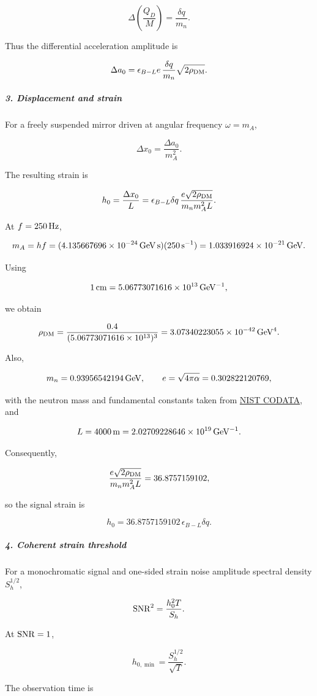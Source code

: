 \[
\Delta\!\left(\frac{Q_D}{M}\right)=\frac{\delta q}{m_n}.
\]

Thus the differential acceleration amplitude is

\[
\Delta a_0 =\epsilon_{B-L}e\,\frac{\delta q}{m_n} \sqrt{2\rho_{\rm DM}}.
\]

\subparagraph*{3. Displacement and strain}

For a freely suspended mirror driven at angular frequency $\omega=m_A$,

\[
\Delta x_0=\frac{\Delta a_0}{m_A^2}.
\]

The resulting strain is

\[
h_0=\frac{\Delta x_0}{L} =\epsilon_{B-L}\delta q\, \frac{e\sqrt{2\rho_{\rm DM}}} {m_n m_A^2L}.
\]

At $f=250\,{\rm Hz}$,

\[
m_A=hf =(4.135667696\times10^{-24}\,{\rm GeV\,s})(250\,{\rm s^{-1}}) =1.033916924\times10^{-21}\,{\rm GeV}.
\]

Using

\[
1\,{\rm cm}=5.06773071616\times10^{13}\,{\rm GeV^{-1}},
\]

we obtain

\[
\rho_{\rm DM} =\frac{0.4}{(5.06773071616\times10^{13})^3} =3.07340223055\times10^{-42}\,{\rm GeV^4}.
\]

Also,

\[
m_n=0.93956542194\,{\rm GeV}, \qquad e=\sqrt{4\pi\alpha}=0.302822120769,
\]

with the neutron mass and fundamental constants taken from \href{\detokenize{https://physics.nist.gov/cuu/pdf/all.pdf}}{NIST CODATA}, and

\[
L=4000\,{\rm m} =2.02709228646\times10^{19}\,{\rm GeV^{-1}}.
\]

Consequently,

\[
\frac{e\sqrt{2\rho_{\rm DM}}}{m_nm_A^2L} =36.8757159102,
\]

so the signal strain is

\[
h_0=36.8757159102\,\epsilon_{B-L}\delta q.
\]

\subparagraph*{4. Coherent strain threshold}

For a monochromatic signal and one-sided strain noise amplitude spectral density $S_h^{1/2}$,

\[
{\rm SNR}^2=\frac{h_0^2T}{S_h}.
\]

At ${\rm SNR}=1$,

\[
h_{0,\min}=\frac{S_h^{1/2}}{\sqrt T}.
\]

The observation time is

